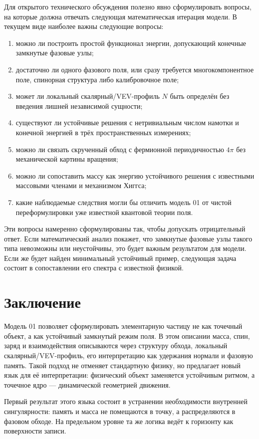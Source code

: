 \documentclass[11pt,a4paper]{article}
\begin{document}
Для открытого технического обсуждения полезно явно сформулировать вопросы, на которые должна отвечать следующая математическая итерация модели. В текущем виде наиболее важны следующие вопросы:
\begin{enumerate}
\item можно ли построить простой функционал энергии, допускающий конечные замкнутые фазовые узлы;
\item достаточно ли одного фазового поля, или сразу требуется многокомпонентное поле, спинорная структура либо калибровочное поле;
\item может ли локальный скалярный/VEV-профиль $N$ быть определён без введения лишней независимой сущности;
\item существуют ли устойчивые решения с нетривиальным числом намотки и конечной энергией в трёх пространственных измерениях;
\item можно ли связать скрученный обход с фермионной периодичностью $4\pi$ без механической картины вращения;
\item можно ли сопоставить массу как энергию устойчивого решения с известными массовыми членами и механизмом Хиггса;
\item какие наблюдаемые следствия могли бы отличить модель 01 от чистой переформулировки уже известной квантовой теории поля.
\end{enumerate}

Эти вопросы намеренно сформулированы так, чтобы допускать отрицательный ответ. Если математический анализ покажет, что замкнутые фазовые узлы такого типа невозможны или неустойчивы, это будет важным результатом для модели. Если же будет найден минимальный устойчивый пример, следующая задача состоит в сопоставлении его спектра с известной физикой.

\section{Заключение}

Модель 01 позволяет сформулировать элементарную частицу не как точечный объект, а как устойчивый замкнутый режим поля. В этом описании масса, спин, заряд и взаимодействия описываются через структуру обхода, локальный скалярный/VEV-профиль, его интерпретацию как удержания нормали и фазовую память. Такой подход не отменяет стандартную физику, но предлагает новый язык для её интерпретации: физический объект заменяется устойчивым ритмом, а точечное ядро --- динамической геометрией движения.

Первый результат этого языка состоит в устранении необходимости внутренней сингулярности: память и масса не помещаются в точку, а распределяются в фазовом обходе. На предельном уровне та же логика ведёт к горизонту как поверхности записи.
\end{document}
